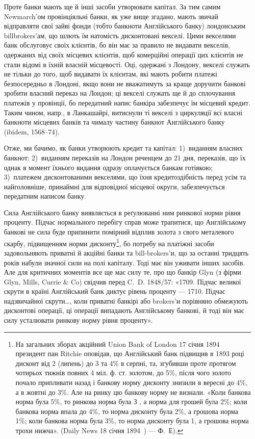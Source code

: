 
Проте банки мають ще й інші засоби утворювати капітал. За тим самим
Newmarch’ом провінціяльні банки, як уже вище згадано, мають звичай відправляти
свої зайві фонди (тобто банкноти Англійського банку) лондонським billbrokers'ам,
що шлють їм натомість дисконтовані векселі. Цими векселями банк
обслуговує своїх клієнтів, бо він має за правило не видавати векселів, одержаних
від своїх місцевих клієнтів, щоб комерційні операції цих клієнтів не стали відомі
в їхній власній місцевості. Оці, одержані з Лондону, векселі служать не тільки
до того, щоб видавати їх клієнтам, які мають робити платежі безпосередньо
в Лондоні, якщо вони не вважатимуть за краще доручити банкові зробити
власний переказ на Лондон; ці векселі служать ще й до сплочування платежів
у провінції, бо передатний напис банкіра забезпечує їм місцевий кредит. Таким
чином, напр., в Ланкашайрі, витиснули ті векселі з циркуляції всі власні банкноти
місцевих банків та чималу частину банкнот Англійського банку (ibidem,
1568--74).

Отже, ми бачимо, як банки утворюють кредит та капітал: 1)~виданням
власних банкнот; 2)~виданням переказів на Лондон реченцем до 21 дня, переказів,
що їх однак в момент їхнього видання одразу оплачується банкам готівкою;
3)~платежем дисконтованими векселями, що їхня кредитоздібність перед
усім та найголовніше, принаймні для відповідної місцевої округи, забезпечується
передатним написом банку.

Сила Англійського банку виявляється в реґулюванні ним ринкової норми
рівня проценту. Підчас нормального перебігу справ може трапитися, що Англійському
банкові не сила буде припинити помірний відплив золота з свого металевого
скарбу, підвищенням норми дисконту\footnote{
На загальних зборах акційний Union Bank of London 17 січня 1894 президент пан Ritchie
оповідав, що Англійський банк підвищив в 1893 році дисконт від 2 (липень) до 3 та 4\% в серпні,
та, згубивши проте протягом чотирьох тижнів повних 4 міл. ф. ст. золотом, до 5\%, після чого
золото почало припливати назад і банкову норму дисконту знизили в вересні до 4\%, а в жовтні до 3\%.
Але на ринку цю банкову норму не визнали. «Коли банкова норма була 5\%, то ринкова норма була З ,
а норма для грошей була 2\%; коли банкова норма впала до 4\%, то норма дисконту була 2\%, а
грошова норма 1\%; коли банкова норма була 3\%, то норма дисконту була 1, а грошова норма
трохи нижча». (Daily News 18 січня 1894~) — Ф.~Е).
}, бо потребу на платіжні засоби
задовольняють приватні й акційні банки та bill-brokers’и, що за останні тридцять
років набули значної сили на полі капіталу. Тоді має він уживати інших
засобів. Але для критичних моментів все ще має силу те, про що банкір Glyn
(з фірми Glyn, Mills, Currie \& Co) свідчив перед C.~D. 1848/57: «1709. Підчас
великої скрути в країні Англійський банк диктує рівень проценту — 1710. Підчас
надзвичайної скрути\dots{}, коли приватні банкірі або brokers’и порівняно обмежують
дисконтові операції, ці операції випадають Англійському банкові, й тоді він має
силу усталювати ринкову норму рівня проценту».

